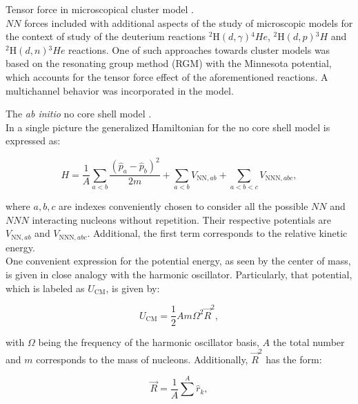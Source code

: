 \documentclass[openany]{book}
\begin{document}
Tensor force in microscopical cluster model \cite{arai_aoyama_suzuki_descouvemont_baye_2013}. \\

$NN$ forces included with additional aspects of the study of microscopic models for the context of study of the deuterium reactions $\mathrm{{}^{2}H}(d, \gamma){}^{4}He$, $\mathrm{{}^{2}H}(d, p){}^{3}H$ and $\mathrm{{}^{2}H}(d, n){}^{3}He$ reactions. One of such approaches towards cluster models was based on the resonating group method (RGM) with the Minnesota potential, which accounts for the tensor force effect of the aforementioned reactions. A multichannel behavior was incorporated in the model. 

The \textit{ab initio} no core shell model \cite{barrett_navratil_vary_2013}. \\

In a single picture the generalized Hamiltonian for the no core shell model is expressed as: 

\begin{equation}\label{eq:micro_NCSM_hamiltonian}
	H = \frac{1}{A} \sum_{a < b} \frac{(\hat p_a - \hat p_b)^2}{2m} + \sum_{a<b} V_{\mathrm{NN}, ab} +  \sum_{a<b < c} V_{\mathrm{NNN}, abc},
\end{equation}

where $a, b, c$ are indexes conveniently chosen to consider all the possible $NN$ and $NNN$ interacting nucleons without repetition. Their respective potentials are $V_{\mathrm{NN}, ab}$ and  $V_{\mathrm{NNN}, abc}$.  Additional, the first term corresponds to the relative kinetic energy. \\

One convenient expression for the potential energy, as seen by the center of mass, is given in close analogy with the harmonic oscillator. Particularly, that potential, which is labeled as $U_{\mathrm{CM}}$, is given by:

\begin{equation}\label{eq:micro_NCSM_potentialHarmonic}
	U_{\mathrm{CM}} = \frac{1}{2} A m \Omega^2 \vec {R}^2,
\end{equation}

with $\Omega$ being the frequency of the harmonic oscillator basis, $A$ the total number  and $m$ corresponds to the mass of nucleons. Additionally, $\vec {R}^2$ has the form: 

\begin{equation}\label{eq:micro_NCSM_R}
	\vec R = \frac{1}{A}\sum_{}^{A} \hat r_k, 
\end{equation}
\end{document}
